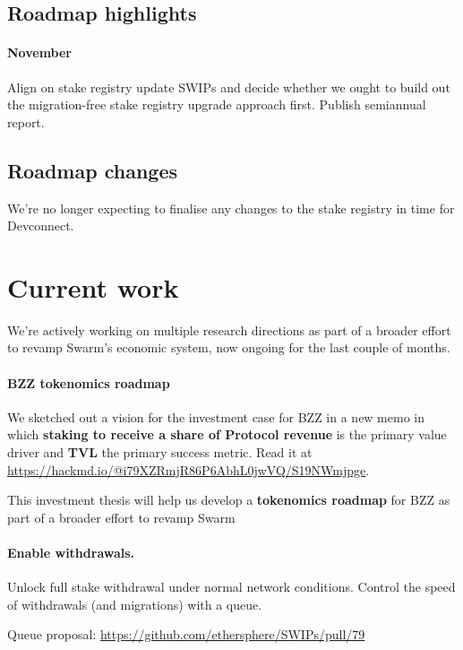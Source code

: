 \subsection*{Roadmap highlights}

\paragraph{November}
%
Align on stake registry update SWIPs and decide whether we ought to build out the migration-free stake registry upgrade approach first.
%
Publish semiannual report.

\subsection*{Roadmap changes}

We're no longer expecting to finalise any changes to the stake registry in time for Devconnect.


\newpage
\section*{Current work}

We're actively working on multiple research directions as part of a broader effort to revamp Swarm's economic system, now ongoing for the last couple of months.

\paragraph{BZZ tokenomics roadmap}

We sketched out a vision for the investment case for BZZ in a new memo in which \textbf{staking to receive a share of Protocol revenue} is the primary value driver and \textbf{TVL} the primary success metric.
%
Read it at \url{https://hackmd.io/@i79XZRmjR86P6AbhL0jwVQ/S19NWmjpge}.

This investment thesis will help us develop a \textbf{tokenomics roadmap} for BZZ as part of a broader effort to revamp Swarm

\paragraph{Enable withdrawals.}
%
Unlock full stake withdrawal under normal network conditions.
%
Control the speed of withdrawals (and migrations) with a queue.

Queue proposal: \url{https://github.com/ethersphere/SWIPs/pull/79}


